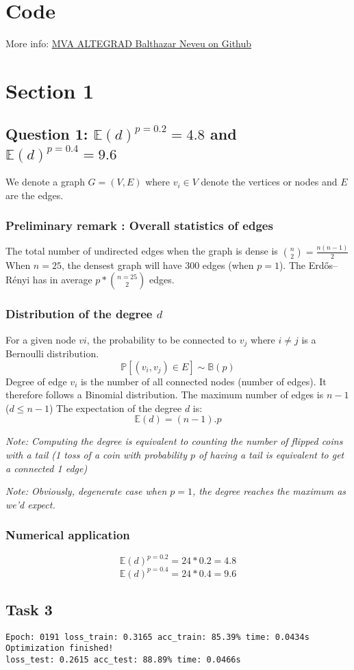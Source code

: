 \documentclass[a4paper]{article}
\begin{document}

\section*{Code}

More info:
\href{https://github.com/balthazarneveu/MVA23_ALTEGRAD/#readme}{MVA ALTEGRAD Balthazar Neveu on Github}

\section{Section 1}
\subsection*{Question 1: $\mathbb{E}(d)^{p=0.2} = 4.8$ and $\mathbb{E}(d)^{p=0.4} = 9.6$}
We denote a graph $G = (V, E)$ where $v_i \in V$ denote the vertices or nodes and $E$ are the edges.
\subsubsection*{Preliminary remark : Overall statistics of edges}

The total number of undirected edges when the graph is dense is ${n\choose 2} =\frac{n(n-1)}{2}$
When $n=25$, the densest graph will have 300 edges (when $p=1$).
The Erdős–Rényi has in average $p * {n=25 \choose 2}$ edges.

\subsubsection*{Distribution of the degree $d$}
For a given node $v{i}$, the probability to be connected to $v_j$ where $i \neq j$ is a
Bernoulli distribution.
$$\mathbb{P}[(v_{i},v_{j}) \in E] \sim \mathbb{B}(p)$$ 
Degree of edge $v_{i}$ is the number of all connected nodes (number of edges).
It therefore follows a Binomial distribution. 
The maximum number of edges is $n-1$ ($d \leq n-1$)
The expectation of the degree $d$ is:
$$\mathbb{E}(d) = (n-1).p$$

\textit{Note: Computing the degree is equivalent to counting the number of flipped coins with a tail (1 toss of a coin with probability $p$ of having a tail is equivalent 
to get a connected 1 edge)}

\textit{Note: Obviously, degenerate case when $p=1$, the degree reaches the maximum as we'd expect.}

\subsubsection*{Numerical application}
$$\mathbb{E}(d)^{p=0.2} = 24*0.2 = 4.8$$
$$\mathbb{E}(d)^{p=0.4} = 24*0.4 = 9.6$$

\subsection*{Task 3}
\begin{verbatim}
Epoch: 0191 loss_train: 0.3165 acc_train: 85.39% time: 0.0434s
Optimization finished!
loss_test: 0.2615 acc_test: 88.89% time: 0.0466s
\end{verbatim}

% 
% 
\end{document}

